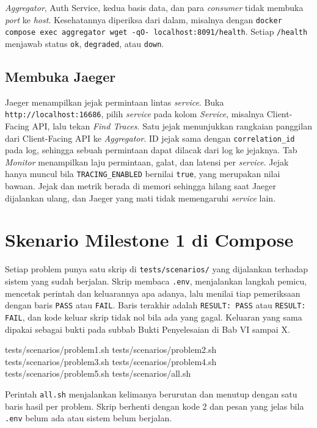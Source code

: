 \textit{Aggregator}, Auth Service, kedua basis data, dan para \textit{consumer} tidak membuka \textit{port} ke \textit{host}. Kesehatannya diperiksa dari dalam, misalnya dengan \texttt{docker compose exec aggregator wget -qO- localhost:8091/health}. Setiap \texttt{/health} menjawab status \texttt{ok}, \texttt{degraded}, atau \texttt{down}.

\subsection{Membuka Jaeger}

Jaeger menampilkan jejak permintaan lintas \textit{service}. Buka \texttt{http://localhost:16686}, pilih \textit{service} pada kolom \textit{Service}, misalnya Client-Facing API, lalu tekan \textit{Find Traces}. Satu jejak menunjukkan rangkaian panggilan dari Client-Facing API ke \textit{Aggregator}. ID jejak sama dengan \texttt{correlation\_id} pada log, sehingga sebuah permintaan dapat dilacak dari log ke jejaknya. Tab \textit{Monitor} menampilkan laju permintaan, galat, dan latensi per \textit{service}. Jejak hanya muncul bila \texttt{TRACING\_ENABLED} bernilai \texttt{true}, yang merupakan nilai bawaan. Jejak dan metrik berada di memori sehingga hilang saat Jaeger dijalankan ulang, dan Jaeger yang mati tidak memengaruhi \textit{service} lain.

\section{Skenario Milestone 1 di Compose}

Setiap problem punya satu skrip di \texttt{tests/scenarios/} yang dijalankan terhadap sistem yang sudah berjalan. Skrip membaca \texttt{.env}, menjalankan langkah pemicu, mencetak perintah dan keluarannya apa adanya, lalu menilai tiap pemeriksaan dengan baris \texttt{PASS} atau \texttt{FAIL}. Baris terakhir adalah \texttt{RESULT: PASS} atau \texttt{RESULT: FAIL}, dan kode keluar skrip tidak nol bila ada yang gagal. Keluaran yang sama dipakai sebagai bukti pada subbab Bukti Penyelesaian di Bab VI sampai X.

\begin{codebox}
tests/scenarios/problem1.sh
tests/scenarios/problem2.sh
tests/scenarios/problem3.sh
tests/scenarios/problem4.sh
tests/scenarios/problem5.sh
tests/scenarios/all.sh
\end{codebox}

Perintah \texttt{all.sh} menjalankan kelimanya berurutan dan menutup dengan satu baris hasil per problem. Skrip berhenti dengan kode 2 dan pesan yang jelas bila \texttt{.env} belum ada atau sistem belum berjalan.

